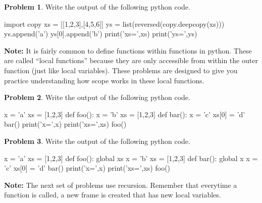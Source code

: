 \documentclass[12pt]{article}
\theoremstyle{definition}
\newtheorem{problem}{Problem}
\begin{document}
\begin{problem}
Write the output of the following python code.
\begin{python}
import copy
xs = [[1,2,3],[4,5,6]]
ys = list(reversed(copy.deepcopy(xs)))
ys.append('a')
ys[0].append('b')
print('xs=',xs)
print('ys=',ys)
\end{python}
\end{problem}

\newpage
\noindent
\textbf{Note:}
It is fairly common to define functions within functions in python.
These are called ``local functions'' because they are only accessible from within the outer function (just like local variables).
These problems are designed to give you practice understanding how scope works in these local functions.

\begin{problem}
Write the output of the following python code.
\begin{python}
x = 'a'
xs = [1,2,3]
def foo():
    x = 'b'
    xs = [1,2,3]
    def bar():
        x = 'c'
        xs[0] = 'd'
    bar()
    print('x=',x)
    print('xs=',xs)
foo()
\end{python}
\end{problem}
\vspace{1in}

\begin{problem}
Write the output of the following python code.
\begin{python}
x = 'a'
xs = [1,2,3]
def foo():
    global xs
    x = 'b'
    xs = [1,2,3]
    def bar():
        global x
        x = 'c'
        xs[0] = 'd'
    bar()
    print('x=',x)
    print('xs=',xs)
foo()
\end{python}
\end{problem}

\newpage
\noindent
\textbf{Note:}
The next set of problems use recursion.
Remember that everytime a function is called, a new frame is created that has new local variables.



\end{document}

